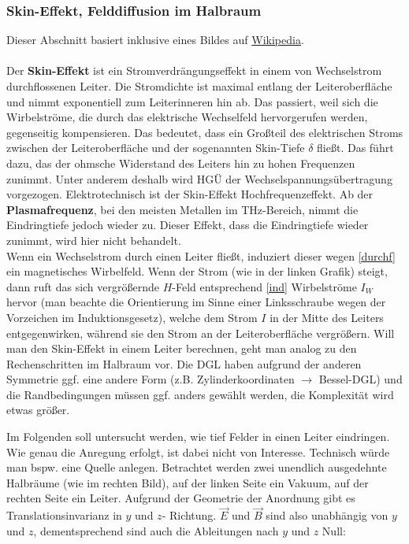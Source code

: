  \subsubsection{Skin-Effekt, Felddiffusion im Halbraum}\label{skin}
 Dieser Abschnitt basiert inklusive eines Bildes auf \href{https://de.wikipedia.org/wiki/Skin-Effekt}{Wikipedia}.\\\\
 Der \textbf{Skin-Effekt} ist ein Stromverdrängungseffekt in einem von Wechselstrom durchflossenen Leiter. Die Stromdichte ist maximal entlang der Leiteroberfläche und nimmt exponentiell zum Leiterinneren hin ab. Das passiert, weil sich die Wirbelströme, die durch das elektrische Wechselfeld hervorgerufen werden, gegenseitig kompensieren. Das bedeutet, dass ein Großteil des elektrischen Stroms zwischen der Leiteroberfläche und der sogenannten Skin-Tiefe $\delta$ fließt. Das führt dazu, das der ohmsche Widerstand des Leiters hin zu hohen Frequenzen zunimmt. Unter anderem deshalb wird HGÜ der Wechselspannungsübertragung vorgezogen. Elektrotechnisch ist der Skin-Effekt Hochfrequenzeffekt. Ab der \textbf{Plasmafrequenz}, bei den meisten Metallen im THz-Bereich, nimmt die Eindringtiefe jedoch wieder zu. Dieser Effekt, dass die Eindringtiefe wieder zunimmt, wird hier nicht behandelt.\\
 Wenn ein Wechselstrom durch einen Leiter fließt, induziert dieser wegen \ref{durchf} ein magnetisches Wirbelfeld. Wenn der Strom (wie in der linken Grafik) steigt, dann ruft das sich vergrößernde $H$-Feld entsprechend \ref{ind} Wirbelströme $I_W$ hervor (man beachte die Orientierung im Sinne einer Linksschraube wegen der Vorzeichen im Induktionsgesetz), welche dem Strom $I$ in der Mitte des Leiters entgegenwirken, während sie den Strom an der Leiteroberfläche vergrößern. Will man den Skin-Effekt in einem Leiter berechnen, geht man analog zu den Rechenschritten im Halbraum vor. Die DGL haben aufgrund der anderen Symmetrie ggf. eine andere Form (z.B. Zylinderkoordinaten $\to$ Bessel-DGL) und die Randbedingungen müssen ggf. anders gewählt werden, die Komplexität wird etwas größer.
 \begin{center}
 \resizebox{.2\textwidth}{!}{}\hspace{1cm}
		  
	  \end{center}
		  Im Folgenden soll untersucht werden, wie tief Felder in einen Leiter eindringen. Wie genau die Anregung erfolgt, ist dabei nicht von Interesse. Technisch würde man bspw. eine Quelle anlegen. Betrachtet werden zwei unendlich ausgedehnte Halbräume (wie im rechten Bild), auf der linken Seite ein Vakuum, auf der rechten Seite ein Leiter. Aufgrund der Geometrie der Anordnung gibt es Translationsinvarianz in $y$ und $z$- Richtung. \(\vec{E} \) und \(\vec{B}  \) sind also unabhängig von \(y\) und \(z\), dementsprechend sind auch die  Ableitungen nach \(y\) und \(z\) Null:
